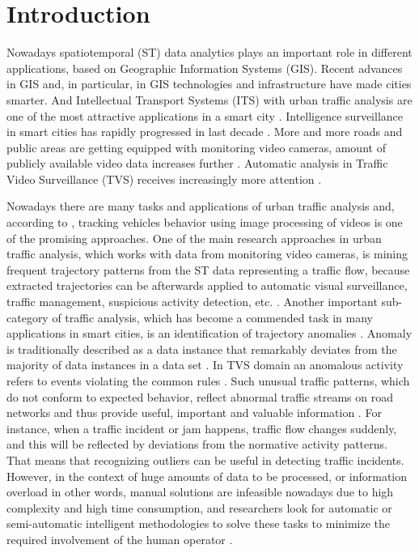 \chapter{Introduction}
\label{ch:Introduction}

Nowadays spatiotemporal (ST) data analytics plays an important role in different applications, based on Geographic Information Systems (GIS). Recent advances in GIS and, in particular, in GIS technologies and infrastructure have made cities smarter. And Intellectual Transport Systems (ITS) with urban traffic analysis are one of the most attractive applications in a smart city \cite{article:2_survey_urban}. Intelligence surveillance in smart cities has rapidly progressed in last decade \cite{article:9_trb_vc_aev_sc}. More and more roads and public areas are getting equipped with monitoring video cameras, amount of publicly available video data increases further \cite{article:4_detect_eatp}. Automatic analysis in Traffic Video Surveillance (TVS) receives increasingly more attention \cite{inproceedings:21_ad_dbscan_tvs}.

Nowadays there are many tasks and applications of urban traffic analysis and, according to \cite{article:9_trb_vc_aev_sc}, tracking vehicles behavior using image processing of videos is one of the promising approaches. One of the main research approaches in urban traffic analysis, which works with data from monitoring video cameras, is mining frequent trajectory patterns from the ST data representing a traffic flow, because extracted trajectories can be afterwards applied to automatic visual surveillance, traffic management, suspicious activity detection, etc. \cite{article:5_survey_tbsa}. Another important sub-category of traffic analysis, which has become a commended task in many applications in smart cities, is an identification of trajectory anomalies \cite{article:9_trb_vc_aev_sc}. Anomaly is traditionally described as a data instance that remarkably deviates from the majority of data instances in a data set \cite{article:1_survey_stdm}. In TVS domain an anomalous activity refers to events violating the common rules \cite{inproceedings:21_ad_dbscan_tvs}. Such unusual traffic patterns, which do not conform to expected behavior, reflect abnormal traffic streams on road networks and thus provide useful, important and valuable information \cite{article:9_trb_vc_aev_sc}. For instance, when a traffic incident or jam happens, traffic flow changes suddenly, and this will be reflected by deviations from the normative activity patterns. That means that recognizing outliers can be useful in detecting traffic incidents. However, in the context of huge amounts of data to be processed, or information overload in other words, manual solutions are infeasible nowadays due to high complexity and high time consumption, and researchers look for automatic or semi-automatic intelligent methodologies to solve these tasks to minimize the required involvement of the human operator \cite{article:19_gbta_ubd_is}.

